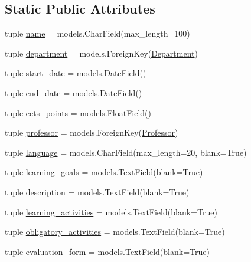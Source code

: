 \subsection*{Static Public Attributes}
\begin{DoxyCompactItemize}
\item 
tuple \hyperlink{classinstitutions_1_1models_1_1_course_ad5ebb3105c1d4829fa8c856135aabfba}{name} = models.\-Char\-Field(max\-\_\-length=100)
\item 
tuple \hyperlink{classinstitutions_1_1models_1_1_course_a1d57fe16fd6b01ef9b36012135ea21a2}{department} = models.\-Foreign\-Key(\hyperlink{classinstitutions_1_1models_1_1_department}{Department})
\item 
tuple \hyperlink{classinstitutions_1_1models_1_1_course_a9b1a2f74ce9382bd635dddd7439d0353}{start\-\_\-date} = models.\-Date\-Field()
\item 
tuple \hyperlink{classinstitutions_1_1models_1_1_course_a8ff56866cd201ac761e31c4723ff6759}{end\-\_\-date} = models.\-Date\-Field()
\item 
tuple \hyperlink{classinstitutions_1_1models_1_1_course_a422f0672536b39978a360ed6eb1a5712}{ects\-\_\-points} = models.\-Float\-Field()
\item 
tuple \hyperlink{classinstitutions_1_1models_1_1_course_a6c35db5cbc1f01d81fac65654377527e}{professor} = models.\-Foreign\-Key(\hyperlink{classinstitutions_1_1models_1_1_professor}{Professor})
\item 
tuple \hyperlink{classinstitutions_1_1models_1_1_course_a88b3f2a131e4fea9b878148e845d31bc}{language} = models.\-Char\-Field(max\-\_\-length=20, blank=True)
\item 
tuple \hyperlink{classinstitutions_1_1models_1_1_course_a224ad04ca2cfd87ee40892e9c4dd3652}{learning\-\_\-goals} = models.\-Text\-Field(blank=True)
\item 
tuple \hyperlink{classinstitutions_1_1models_1_1_course_a6e7537e93fc978769a7c1e5fcb543ff2}{description} = models.\-Text\-Field(blank=True)
\item 
tuple \hyperlink{classinstitutions_1_1models_1_1_course_a90d7f9bf44484a4ab54923d68801ab3e}{learning\-\_\-activities} = models.\-Text\-Field(blank=True)
\item 
tuple \hyperlink{classinstitutions_1_1models_1_1_course_ac211becffaff0a8f2a941f3376e61926}{obligatory\-\_\-activities} = models.\-Text\-Field(blank=True)
\item 
tuple \hyperlink{classinstitutions_1_1models_1_1_course_a129f61c6b671a8adef29a3e3560b8da2}{evaluation\-\_\-form} = models.\-Text\-Field(blank=True)
\end{DoxyCompactItemize}


